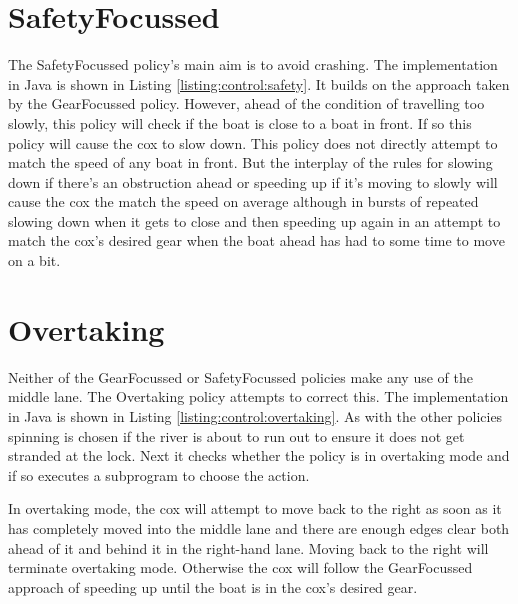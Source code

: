 

\section{SafetyFocussed}

The SafetyFocussed policy's main aim is to avoid crashing. The implementation in Java is shown in Listing \ref{listing:control:safety}. It builds on the approach taken by the GearFocussed policy. However, ahead of the condition of travelling too slowly, this policy will check if the boat is close to a boat in front. If so this policy will cause the cox to slow down. This policy does not directly attempt to match the speed of any boat in front. But the interplay of the rules for slowing down if there's an obstruction ahead or speeding up if it's moving to slowly will cause the cox the match the speed on average although in bursts of repeated slowing down when it gets to close and then speeding up again in an attempt to match the cox's desired gear when the boat ahead has had to some time to move on a bit.



\section{Overtaking}

Neither of the GearFocussed or SafetyFocussed policies make any use of the middle lane. The Overtaking policy  attempts to correct this. The implementation in Java is shown in Listing \ref{listing:control:overtaking}. As with the other policies spinning is chosen if the river is about to run out to ensure it does not get stranded at the lock. Next it checks whether the policy is in overtaking mode and if so executes a subprogram to choose the action.

In overtaking mode, the cox will attempt to move back to the right as soon as it has completely moved into the middle lane and there are enough edges clear both ahead of it and behind it in the right-hand lane. Moving back to the right will terminate overtaking mode. Otherwise the cox will follow the GearFocussed approach of speeding up until the boat is in the cox's desired gear.

